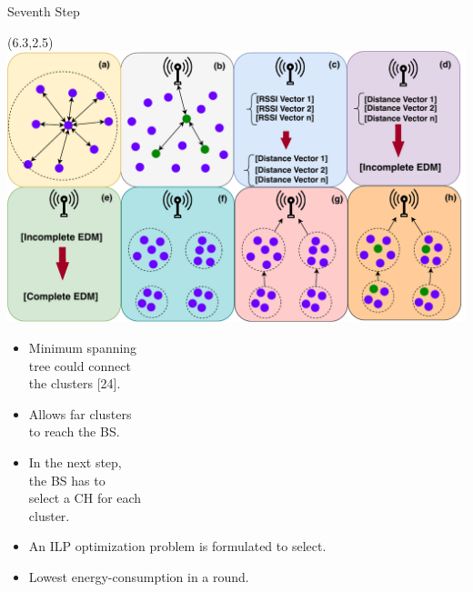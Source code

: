 \documentclass{beamer}
\begin{document}
\begin{frame}[t]{Seventh Step} %
\begin{textblock}{0.8}(6.3,2.5)
\includegraphics[scale=0.35]{figure/Steps.pdf}
\end{textblock}
\begin{itemize}

\item Minimum spanning \\ tree could connect \\ the clusters [24].

\item Allows far clusters \\ to reach the BS.

\item In the next step, \\ the BS has to \\ select a CH for each \\ cluster.

\item An ILP optimization problem  is formulated to select.

\item Lowest energy-consumption in a round.

\end{itemize}
\end{frame}
\end{document}
